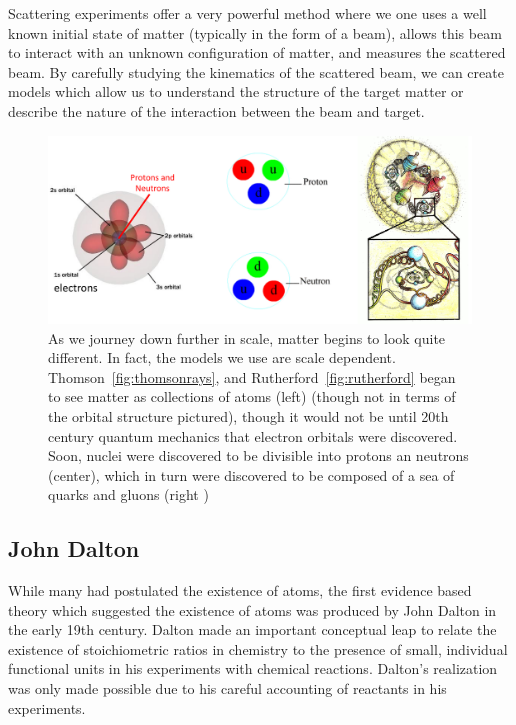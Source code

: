 Scattering experiments offer a very powerful method where we one uses a well
known initial state of matter (typically in the form of a beam), allows this
beam to interact with an unknown configuration of matter, and measures the
scattered beam. By carefully studying the kinematics of the scattered beam, we
can create models which allow us to understand the structure of the target
matter or describe the nature of the interaction between the beam and target. 

\begin{figure}[ht]
	\centering
	\includegraphics[width=\linewidth]{./figures/scale_of_matter.png}
	\caption{
		As we journey down further in scale, matter begins to look quite different.
		In fact, the models we use are scale dependent.
		Thomson~\ref{fig:thomsonrays}, and Rutherford~\ref{fig:rutherford} began to
		see matter as collections of atoms (left)  \cite{Freudenrich2001} (though
		not in terms of the orbital structure pictured), though it would not be
		until 20th century quantum mechanics that electron orbitals were
		discovered.  Soon, nuclei were discovered to be divisible into protons an
		neutrons  \cite{Manisearth2010} (center), which in turn were discovered to
		be composed of a sea of quarks and gluons (right \cite{Morreale2009})
	}
	\label{fig:scale_of_matter}
\end{figure}

\subsection{John Dalton}

While many had postulated the existence of atoms, the first evidence based
theory which suggested the existence of atoms was produced by John Dalton in the
early 19th century. Dalton made an important conceptual leap to relate the
existence of stoichiometric ratios in chemistry to the presence of small,
individual functional units in his experiments with chemical reactions.
Dalton's realization was only made possible due to his careful accounting of
reactants in his experiments.


